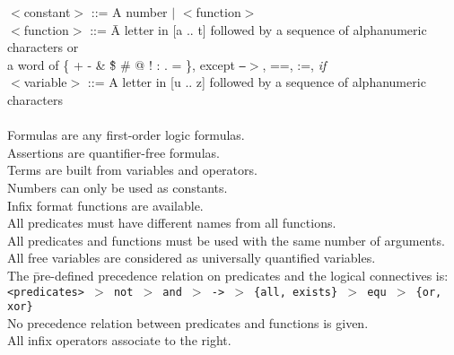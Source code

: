\begin{tabbing}
 $<$constant$>$ ::= A number $|$ $<$function$>$ \\
 $<$function$>$ ::= \= A letter in [a .. t] followed by a sequence of alphanumeric  characters or \\
 \>  a word of \{ + - \& \^ \$ \# @ ! : . = \}, 
except {\tt ---}$>$, ==, :=, {\em if}\\
 $<$variable$>$ ::= A letter in [u .. z] followed by a sequence of alphanumeric characters\\ \\
 Formulas are any first-order logic formulas. \\
 Assertions are quantifier-free formulas. \\
 Terms are built from variables and operators.\\
 Numbers can only be used as constants.\\
 Infix format functions are available.\\
 All predicates must have different names from all functions.\\
 All predicates and functions must be used with the same number of arguments.\\
 All free variables are considered as universally quantified variables.\\
 The \= pre-defined precedence relation on predicates and 
the logical connectives is:\\
\>  {\tt  <predicates> $>$ not $>$ and $>$ -> $>$ \{all, exists\} $>$ equ $>$ \{or, xor\}} \\
 No precedence relation between predicates and functions is given. \\
 All infix operators associate to the right.
\end{tabbing}
\normalsize
\rm
